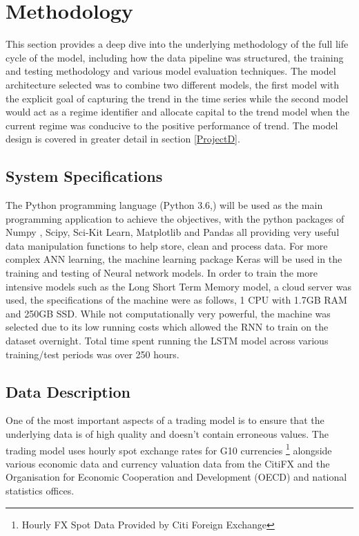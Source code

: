 \documentclass[11pt]{article}
\begin{document}
\clearpage

\section{Methodology} \label{method}

This section provides a deep dive into the underlying methodology of the full life cycle of the model, including how the data pipeline was structured,  the training and testing methodology and various model evaluation techniques. The model architecture selected was to combine two different models, the first model with the explicit goal of capturing the trend in the time series while the second model would act as a regime identifier and allocate capital to the trend model when the current regime was conducive to the positive performance of trend. The model design is covered in greater detail in section \ref{ProjectD}.

\subsection{System Specifications}
The Python programming language (Python 3.6,\cite{McKinney1976}) will be used as the main programming application to achieve the objectives, with the python packages of Numpy \cite{VanDerWalt2011}, Scipy\cite{Tobergte2013}, Sci-Kit Learn\cite{Geron2017}, Matplotlib\cite{Wood2015} and Pandas\cite{Reiff2002} all providing very useful data manipulation functions to help store, clean and process data. For more complex ANN learning, the machine learning package Keras  \cite{Chollet2015} will be used in the training and testing of Neural network models. In order to train the more intensive models such as the Long Short Term Memory model, a cloud server was used, the specifications of the machine were as follows, 1 CPU with 1.7GB RAM and 250GB SSD. While not computationally very powerful, the machine was selected due to its low running costs which allowed the RNN to train on the dataset overnight. Total time spent running the LSTM model across various training/test periods was over 250 hours. 


\subsection{Data Description}
One of the most important aspects of a trading model is to ensure that the underlying data is of high quality and doesn't contain erroneous values. The trading model uses hourly spot exchange rates for G10 currencies \footnote{Hourly FX Spot Data Provided by Citi Foreign Exchange} alongside various economic data and currency valuation data from the CitiFX and the Organisation for Economic Cooperation and Development (OECD) and national statistics offices.
\end{document}
